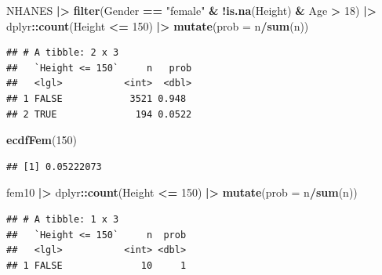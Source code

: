 \documentclass[
  12pt,dutch]{book}
\newenvironment{Shaded}{\begin{snugshade}}{\end{snugshade}}
\newcommand{\AttributeTok}[1]{\textcolor[rgb]{0.13,0.29,0.53}{#1}}
\newcommand{\DecValTok}[1]{\textcolor[rgb]{0.00,0.00,0.81}{#1}}
\newcommand{\FunctionTok}[1]{\textcolor[rgb]{0.13,0.29,0.53}{\textbf{#1}}}
\newcommand{\NormalTok}[1]{#1}
\newcommand{\SpecialCharTok}[1]{\textcolor[rgb]{0.81,0.36,0.00}{\textbf{#1}}}
\newcommand{\StringTok}[1]{\textcolor[rgb]{0.31,0.60,0.02}{#1}}
\theoremstyle{definition}
\theoremstyle{definition}
\theoremstyle{definition}
\theoremstyle{definition}
\theoremstyle{remark}
\begin{document}
\begin{Shaded}
\begin{Highlighting}[]
\NormalTok{NHANES }\SpecialCharTok{|\textgreater{}}
    \FunctionTok{filter}\NormalTok{(Gender }\SpecialCharTok{==} \StringTok{"female"} \SpecialCharTok{\&} \SpecialCharTok{!}\FunctionTok{is.na}\NormalTok{(Height) }\SpecialCharTok{\&}\NormalTok{ Age }\SpecialCharTok{\textgreater{}}
        \DecValTok{18}\NormalTok{) }\SpecialCharTok{|\textgreater{}}
\NormalTok{    dplyr}\SpecialCharTok{::}\FunctionTok{count}\NormalTok{(Height }\SpecialCharTok{\textless{}=} \DecValTok{150}\NormalTok{) }\SpecialCharTok{|\textgreater{}}
    \FunctionTok{mutate}\NormalTok{(}\AttributeTok{prob =}\NormalTok{ n}\SpecialCharTok{/}\FunctionTok{sum}\NormalTok{(n))}
\end{Highlighting}
\end{Shaded}

\begin{verbatim}
## # A tibble: 2 x 3
##   `Height <= 150`     n   prob
##   <lgl>           <int>  <dbl>
## 1 FALSE            3521 0.948 
## 2 TRUE              194 0.0522
\end{verbatim}

\begin{Shaded}
\begin{Highlighting}[]
\FunctionTok{ecdfFem}\NormalTok{(}\DecValTok{150}\NormalTok{)}
\end{Highlighting}
\end{Shaded}

\begin{verbatim}
## [1] 0.05222073
\end{verbatim}

\begin{Shaded}
\begin{Highlighting}[]
\NormalTok{fem10 }\SpecialCharTok{|\textgreater{}}
\NormalTok{    dplyr}\SpecialCharTok{::}\FunctionTok{count}\NormalTok{(Height }\SpecialCharTok{\textless{}=} \DecValTok{150}\NormalTok{) }\SpecialCharTok{|\textgreater{}}
    \FunctionTok{mutate}\NormalTok{(}\AttributeTok{prob =}\NormalTok{ n}\SpecialCharTok{/}\FunctionTok{sum}\NormalTok{(n))}
\end{Highlighting}
\end{Shaded}

\begin{verbatim}
## # A tibble: 1 x 3
##   `Height <= 150`     n  prob
##   <lgl>           <int> <dbl>
## 1 FALSE              10     1
\end{verbatim}
\end{document}
